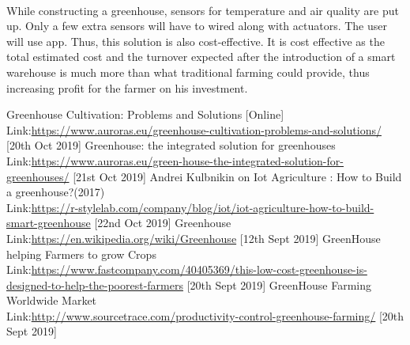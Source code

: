 \documentclass[12pt]{extarticle}
\begin{document}
\paragraph{}
While constructing a greenhouse, sensors for temperature and air quality are put up. Only a few extra sensors will have to wired along with actuators. The user will use app. Thus, this solution is also cost-effective. It is cost effective as the total estimated cost and the turnover expected after the introduction of a smart warehouse is much more than what traditional farming could provide, thus increasing profit for the farmer on his investment.
\begin{thebibliography}{9}
    Greenhouse Cultivation: Problems and Solutions [Online]\\
    Link:\href{https://www.auroras.eu/greenhouse-cultivation-problems-and-solutions/}{https://www.auroras.eu/greenhouse-cultivation-problems-and-solutions/} [20th Oct 2019]
    Greenhouse: the integrated solution for greenhouses\\
    Link:\href{https://www.auroras.eu/green-house-the-integrated-solution-for-greenhouses/}{https://www.auroras.eu/green-house-the-integrated-solution-for-greenhouses/} [21st Oct 2019]
    Andrei Kulbnikin on Iot Agriculture : How to Build a greenhouse?(2017)\\
    Link:\href{https://r-stylelab.com/company/blog/iot/iot-agriculture-how-to-build-smart-greenhouse}{https://r-stylelab.com/company/blog/iot/iot-agriculture-how-to-build-smart-greenhouse} [22nd Oct 2019]
    Greenhouse\\
    Link:\href{https://en.wikipedia.org/wiki/Greenhouse}{https://en.wikipedia.org/wiki/Greenhouse} [12th Sept 2019]
    GreenHouse helping Farmers to grow Crops\\
    Link:\href{https://www.fastcompany.com/40405369/this-low-cost-greenhouse-is-designed-to-help-the-poorest-farmers}{https://www.fastcompany.com/40405369/this-low-cost-greenhouse-is-designed-to-help-the-poorest-farmers} [20th Sept 2019]
    GreenHouse Farming Worldwide Market\\
    Link:\href{http://www.sourcetrace.com/productivity-control-greenhouse-farming/}{http://www.sourcetrace.com/productivity-control-greenhouse-farming/} [20th Sept 2019]
\end{thebibliography}
% 
\end{document}
